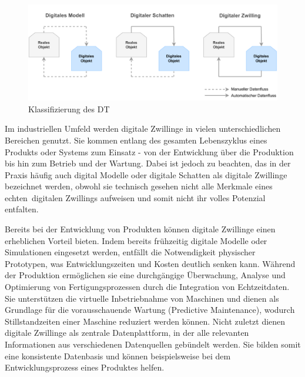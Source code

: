 
\begin{figure}[htbp]
    \centering
    \includegraphics[width=1\textwidth]{Bilder/klassifizierung_DT.pdf}
    \caption{Klassifizierung des DT}
    \label{fig:klassifizierungDT}
\end{figure}

Im industriellen Umfeld werden digitale Zwillinge in vielen unterschiedlichen Bereichen genutzt.
Sie kommen entlang des gesamten Lebenszyklus eines Produkts oder Systems zum Einsatz - von der Entwicklung über die Produktion bis hin zum Betrieb und der Wartung. 
Dabei ist jedoch zu beachten, das in der Praxis häufig auch digital Modelle oder digitale Schatten als digitale Zwillinge bezeichnet werden, obwohl sie technisch gesehen nicht alle Merkmale eines \glqq echten\grqq~digitalen Zwillings aufweisen und somit nicht ihr volles Potenzial entfalten.

Bereits bei der Entwicklung von Produkten können digitale Zwillinge einen erheblichen Vorteil bieten. 
Indem bereits frühzeitig digitale Modelle oder Simulationen eingesetzt werden, entfällt die Notwendigkeit physischer Prototypen, was Entwicklungszeiten und Kosten deutlich senken kann. Während der Produktion ermöglichen sie eine durchgängige Überwachung, Analyse und Optimierung von Fertigungsprozessen durch die Integration von Echtzeitdaten.
Sie unterstützen die virtuelle Inbetriebnahme von Maschinen und dienen als Grundlage für die vorausschauende Wartung (Predictive Maintenance), wodurch Stillstandzeiten einer Maschine reduziert werden können.
Nicht zuletzt dienen digitale Zwillinge als zentrale Datenplattform, in der alle relevanten Informationen aus verschiedenen Datenquellen gebündelt werden.
Sie bilden somit eine konsistente Datenbasis und können beispielsweise bei dem Entwicklungsprozess eines Produktes helfen. \cite{DTForSmartManufacturing}

